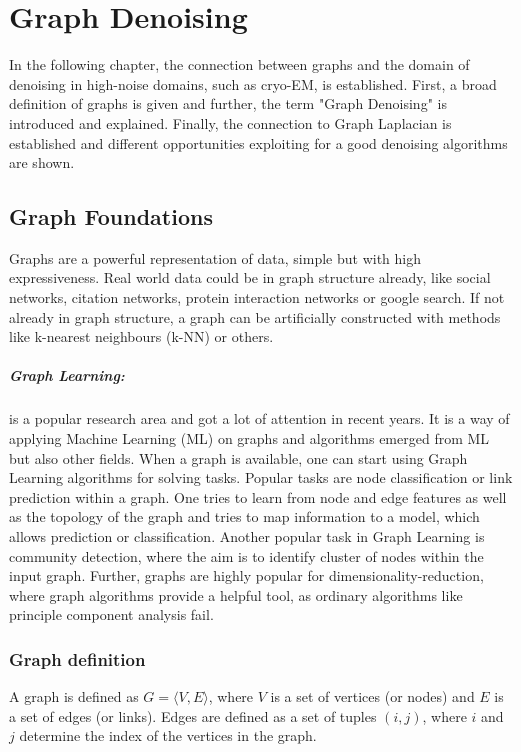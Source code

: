 \chapter{Graph Denoising}
\label{sec:graphDenoising}
    

In the following chapter, the connection between graphs and the domain of denoising in high-noise 
domains, such as cryo-EM, is established.
First, a broad definition of graphs is given and further, the term "Graph Denoising" is
introduced and explained. Finally, the connection to Graph Laplacian is established
and different opportunities exploiting for a good denoising algorithms are shown.


\section{Graph Foundations}
Graphs are a powerful representation of data, simple but with high expressiveness. 
Real world data could be in graph structure already, like social networks, citation networks,
protein interaction networks or google search. 
If not already in graph structure, a graph can be artificially constructed with methods like k-nearest neighbours (k-NN) or others.

\paragraph{Graph Learning:} is a popular research area and got a lot of attention in recent years.
It is a way of applying Machine Learning (ML) on graphs and algorithms emerged from ML but also other fields.
When a graph is available, one can start using Graph Learning algorithms for solving tasks.
Popular tasks are node classification or link prediction within a graph. One tries to learn from node and edge features 
as well as the topology of the graph and tries to map information to a model, which allows prediction or classification.
Another popular task in Graph Learning is community detection, where the aim is to identify cluster of nodes within the input graph.
Further, graphs are highly popular for dimensionality-reduction, where 
graph algorithms provide a helpful tool, as ordinary algorithms like principle component analysis fail.

\subsection{Graph definition}
A graph is defined as  $G = \langle V,E \rangle$, where $V$ is a set of 
vertices (or nodes) and $E$ is a set of edges (or links). 
Edges are defined as a set of tuples $(i, j)$, where $i$ and $j$ determine the index of the vertices in the graph.


